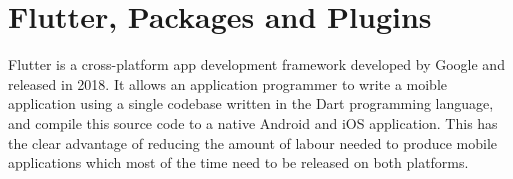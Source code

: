 \section{Flutter, Packages and Plugins}



Flutter is a cross-platform app development framework developed by Google and released in 2018. It allows an application programmer to write a moible application using a single codebase written in the Dart programming language, and compile this source code to a native Android and iOS application. This has the clear advantage of reducing the amount of labour needed to produce mobile applications which most of the time need to be released on both platforms. 


